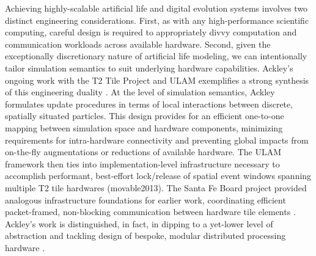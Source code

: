 Achieving highly-scalable artificial life and digital evolution systems involves two distinct engineering considerations.
First, as with any high-performance scientific computing, careful design is required to appropriately divvy computation and communication workloads across available hardware.
Second, given the exceptionally discretionary nature of artificial life modeling, we can intentionally tailor simulation semantics to suit underlying hardware capabilities.
Ackley's ongoing work with the T2 Tile Project and ULAM exemplifies a strong synthesis of this engineering duality \citep{CITEULAM}.
At the level of simulation semantics, Ackley formulates update procedures in terms of local interactions between discrete, spatially situated particles.
This design provides for an efficient one-to-one mapping between simulation space and hardware components, minimizing requirements for intra-hardware connectivity and preventing global impacts from on-the-fly augmentations or reductions of available hardware.
The ULAM framework then ties into implementation-level infrastructure necessary to accomplish performant, best-effort lock/release of spatial event windows spanning multiple T2 tile hardwares (movable2013).
The Santa Fe Board project provided analogous infrastructure foundations for earlier work, coordinating efficient packet-framed, non-blocking communication between hardware tile elements \citep{https://livingcomputation.com/s/doc/}.
Ackley's work is distinguished, in fact, in dipping to a yet-lower level of abstraction and tackling design of bespoke, modular distributed processing hardware \citep{ILLUMINAXMACHINA,T2PROJECT}.

